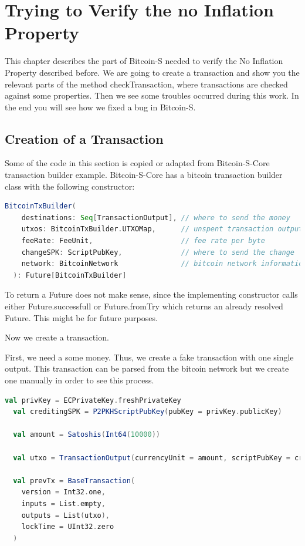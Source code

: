 \chapter{Trying to Verify the no Inflation Property}
\label{chap:verify_check}

This chapter describes the part of Bitcoin-S needed to verify the No Inflation Property described before.
We are going to create a transaction and show you the relevant parts of the method checkTransaction, where transactions are checked against some properties.
Then we see some troubles occurred during this work.
In the end you will see how we fixed a bug in Bitcoin-S.


\section{Creation of a Transaction}

Some of the code in this section is copied or adapted from Bitcoin-S-Core transaction builder example.\cite{BitcoinSCore:txbuilderexample}
Bitcoin-S-Core has a bitcoin transaction builder class with the following constructor:
\begin{lstlisting}[language=scala]
  BitcoinTxBuilder(
    destinations: Seq[TransactionOutput], // where to send the money
    utxos: BitcoinTxBuilder.UTXOMap,      // unspent transaction outputs
    feeRate: FeeUnit,                     // fee rate per byte
    changeSPK: ScriptPubKey,              // where to send the change
    network: BitcoinNetwork               // bitcoin network information
  ): Future[BitcoinTxBuilder]
\end{lstlisting}

To return a Future does not make sense, since the implementing constructor calls either Future.successfull or Future.fromTry which returns an already resolved Future.
This might be for future purposes.

Now we create a transaction.

First, we need a some money.
Thus, we create a fake transaction with one single output.
This transaction can be parsed from the bitcoin network but we create one manually in order to see this process.
\begin{lstlisting}[language=scala]
  val privKey = ECPrivateKey.freshPrivateKey
  val creditingSPK = P2PKHScriptPubKey(pubKey = privKey.publicKey)

  val amount = Satoshis(Int64(10000))

  val utxo = TransactionOutput(currencyUnit = amount, scriptPubKey = creditingSPK)

  val prevTx = BaseTransaction(
    version = Int32.one,
    inputs = List.empty,
    outputs = List(utxo),
    lockTime = UInt32.zero
  )
\end{lstlisting}

